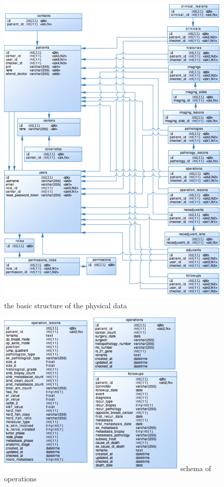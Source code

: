 \begin{figure}[!htp]
  \centering
  \includegraphics{figure/chap3-1_database_schema.png}
    {the basic structure of the physical data}
  \label{fig:ch3-1}
\end{figure}




\begin{figure}[!htp]
  \centering
  \includegraphics{figure/chap3-6_operations.png}
    {schema of operations}
  \label{fig:ch3-6}
\end{figure}

